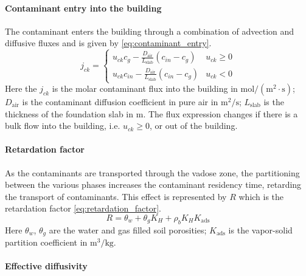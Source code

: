 \paragraph{Contaminant entry into the building}

The contaminant enters the building through a combination of advection and diffusive fluxes and is given by \eqref{eq:contaminant_entry}.
\begin{equation}\label{eq:contaminant_entry}
  j_{ck} = \begin{cases}
    u_{ck} c_g - \frac{D_\mathrm{air}}{L_\mathrm{slab}} (c_{in} - c_g) & u_{ck} \geq 0 \\
    u_{ck} c_{in} - \frac{D_\mathrm{air}}{L_\mathrm{slab}} (c_{in} - c_g) & u_{ck} < 0
\end{cases}
\end{equation}
Here the $j_{ck}$ is the molar contaminant flux into the building in $\mathrm{mol/(m^2 \cdot s)}$;
$D_\mathrm{air}$ is the contaminant diffusion coefficient in pure air in $\mathrm{m^2/s}$;
$L_\mathrm{slab}$ is the thickness of the foundation slab in $\mathrm{m}$.
The flux expression changes if there is a bulk flow into the building, i.e. $u_{ck} \geq 0$, or out of the building.

\paragraph{Retardation factor}

As the contaminants are transported through the vadose zone, the partitioning between the various phases increases the contaminant residency time, retarding the transport of contaminants.
This effect is represented by $R$ which is the retardation factor \eqref{eq:retardation_factor}.
\begin{equation}\label{eq:retardation_factor}
  R = \theta_w + \theta_g K_H + \rho_b K_H K_\mathrm{ads}
\end{equation}
Here $\theta_w$, $\theta_g$ are the water and gas filled soil porosities;
$K_\mathrm{ads}$ is the vapor-solid partition coefficient in $\mathrm{m^3/kg}$.\par

\paragraph{Effective diffusivity}

